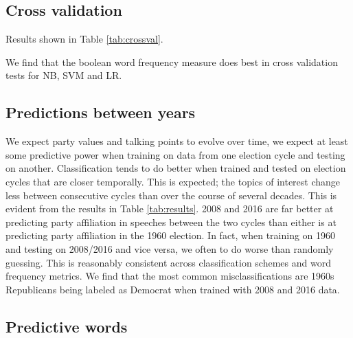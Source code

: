 \documentclass[aps, prl, reprint, showpacs]{revtex4-1}
\begin{document}
\subsection{Cross validation}

Results shown in Table \ref{tab:crossval}.

We find that the boolean word frequency measure does best in cross validation tests for NB, SVM and LR.

\subsection{Predictions between years}

We expect party values and talking points to evolve over time, we expect at least some predictive power when training on data from one election cycle and testing on another. Classification tends to do better when trained and tested on election cycles that are closer temporally. This is expected; the topics of interest change less between consecutive cycles than over the course of several decades. This is evident from the results in Table \ref{tab:results}. 2008 and 2016 are far better at predicting party affiliation in speeches between the two cycles than either is at predicting party affiliation in the 1960 election. In fact, when training on 1960 and testing on 2008/2016 and vice versa, we often to do worse than randomly guessing. This is reasonably consistent across classification schemes and word frequency metrics. We find that the most common misclassifications are 1960s Republicans being labeled as Democrat when trained with 2008 and 2016 data.

\subsection{Predictive words}
\end{document}
